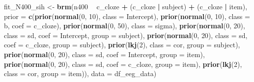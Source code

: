 \documentclass[12pt,]{krantz}
\newenvironment{Shaded}{\begin{snugshade}}{\end{snugshade}}
\newcommand{\KeywordTok}[1]{\textcolor[rgb]{0.13,0.29,0.53}{\textbf{#1}}}
\newcommand{\DataTypeTok}[1]{\textcolor[rgb]{0.13,0.29,0.53}{#1}}
\newcommand{\DecValTok}[1]{\textcolor[rgb]{0.00,0.00,0.81}{#1}}
\newcommand{\StringTok}[1]{\textcolor[rgb]{0.31,0.60,0.02}{#1}}
\newcommand{\OperatorTok}[1]{\textcolor[rgb]{0.81,0.36,0.00}{\textbf{#1}}}
\newcommand{\NormalTok}[1]{#1}
\theoremstyle{definition}
\theoremstyle{definition}
\theoremstyle{definition}
\theoremstyle{remark}
\begin{document}
\begin{Shaded}
\begin{Highlighting}[]
\NormalTok{fit_N400_sih <-}\StringTok{ }\KeywordTok{brm}\NormalTok{(n400 }\OperatorTok{~}\StringTok{ }\NormalTok{c_cloze }\OperatorTok{+}\StringTok{ }\NormalTok{(c_cloze }\OperatorTok{|}\StringTok{ }\NormalTok{subject) }\OperatorTok{+}\StringTok{ }\NormalTok{(c_cloze }\OperatorTok{|}\StringTok{ }\NormalTok{item),}
                  \DataTypeTok{prior =}
                      \KeywordTok{c}\NormalTok{(}\KeywordTok{prior}\NormalTok{(}\KeywordTok{normal}\NormalTok{(}\DecValTok{0}\NormalTok{, }\DecValTok{10}\NormalTok{), }\DataTypeTok{class =}\NormalTok{ Intercept),}
                        \KeywordTok{prior}\NormalTok{(}\KeywordTok{normal}\NormalTok{(}\DecValTok{0}\NormalTok{, }\DecValTok{10}\NormalTok{), }\DataTypeTok{class =}\NormalTok{ b, }\DataTypeTok{coef =}\NormalTok{ c_cloze),}
                        \KeywordTok{prior}\NormalTok{(}\KeywordTok{normal}\NormalTok{(}\DecValTok{0}\NormalTok{, }\DecValTok{50}\NormalTok{), }\DataTypeTok{class =}\NormalTok{ sigma),}
                        \KeywordTok{prior}\NormalTok{(}\KeywordTok{normal}\NormalTok{(}\DecValTok{0}\NormalTok{, }\DecValTok{20}\NormalTok{), }\DataTypeTok{class =}\NormalTok{ sd, }\DataTypeTok{coef =}\NormalTok{ Intercept, }\DataTypeTok{group =}\NormalTok{ subject),}
                        \KeywordTok{prior}\NormalTok{(}\KeywordTok{normal}\NormalTok{(}\DecValTok{0}\NormalTok{, }\DecValTok{20}\NormalTok{), }\DataTypeTok{class =}\NormalTok{ sd, }\DataTypeTok{coef =}\NormalTok{ c_cloze, }\DataTypeTok{group =}\NormalTok{ subject),}
                        \KeywordTok{prior}\NormalTok{(}\KeywordTok{lkj}\NormalTok{(}\DecValTok{2}\NormalTok{), }\DataTypeTok{class =}\NormalTok{ cor, }\DataTypeTok{group =}\NormalTok{ subject),}
                        \KeywordTok{prior}\NormalTok{(}\KeywordTok{normal}\NormalTok{(}\DecValTok{0}\NormalTok{, }\DecValTok{20}\NormalTok{), }\DataTypeTok{class =}\NormalTok{ sd, }\DataTypeTok{coef =}\NormalTok{ Intercept, }\DataTypeTok{group =}\NormalTok{ item),}
                        \KeywordTok{prior}\NormalTok{(}\KeywordTok{normal}\NormalTok{(}\DecValTok{0}\NormalTok{, }\DecValTok{20}\NormalTok{), }\DataTypeTok{class =}\NormalTok{ sd, }\DataTypeTok{coef =}\NormalTok{ c_cloze, }\DataTypeTok{group =}\NormalTok{ item),}
                        \KeywordTok{prior}\NormalTok{(}\KeywordTok{lkj}\NormalTok{(}\DecValTok{2}\NormalTok{), }\DataTypeTok{class =}\NormalTok{ cor, }\DataTypeTok{group =}\NormalTok{ item)),}
                  \DataTypeTok{data =}\NormalTok{ df_eeg_data)}
\end{Highlighting}
\end{Shaded}
\end{document}
